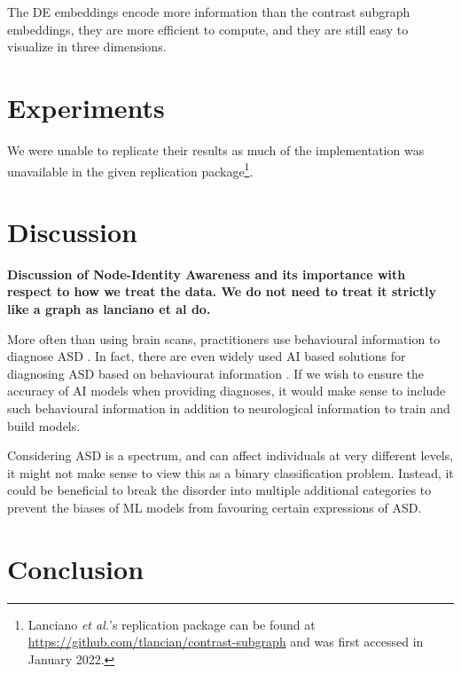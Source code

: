 \documentclass[letterpaper]{article}
\begin{document}
The DE embeddings encode more information than the contrast subgraph embeddings, they are more efficient to compute, and they are still easy to visualize in three dimensions.



\section{Experiments}

We were unable to replicate their results as much of the implementation was unavailable in the given replication package\footnote{Lanciano \emph{et al.}'s replication package can be found at \url{https://github.com/tlancian/contrast-subgraph} and was first accessed in January 2022.}.



\section{Discussion}
\textbf{Discussion of Node-Identity Awareness and its importance with respect to how we treat the data. We do not need to treat it strictly like a graph as lanciano et al do.}

More often than using brain scans, practitioners use behavioural information to diagnose ASD \cite{lord2006, johnson2007, dsm52013}.
In fact, there are even widely used AI based solutions for diagnosing ASD based on behaviourat information \cite{knopf2021}.
If we wish to ensure the accuracy of AI models when providing diagnoses, it would make sense to include such behavioural information in addition to neurological information to train and build models.

Considering ASD is a spectrum, and can affect individuals at very different levels, it might not make sense to view this as a binary classification problem.
Instead, it could be beneficial to break the disorder into multiple additional categories to prevent the biases of ML models from favouring certain expressions of ASD.





\section{Conclusion}
\end{document}
